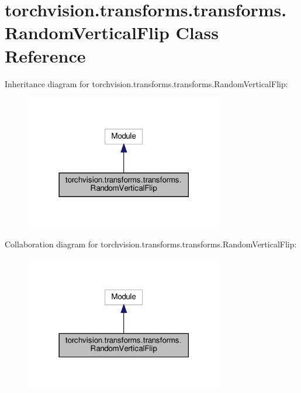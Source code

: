 \hypertarget{classtorchvision_1_1transforms_1_1transforms_1_1RandomVerticalFlip}{}\section{torchvision.\+transforms.\+transforms.\+Random\+Vertical\+Flip Class Reference}
\label{classtorchvision_1_1transforms_1_1transforms_1_1RandomVerticalFlip}


Inheritance diagram for torchvision.\+transforms.\+transforms.\+Random\+Vertical\+Flip\+:
\nopagebreak
\begin{figure}[H]
\begin{center}
\leavevmode
\includegraphics[width=246pt]{classtorchvision_1_1transforms_1_1transforms_1_1RandomVerticalFlip__inherit__graph}
\end{center}
\end{figure}


Collaboration diagram for torchvision.\+transforms.\+transforms.\+Random\+Vertical\+Flip\+:
\nopagebreak
\begin{figure}[H]
\begin{center}
\leavevmode
\includegraphics[width=246pt]{classtorchvision_1_1transforms_1_1transforms_1_1RandomVerticalFlip__coll__graph}
\end{center}
\end{figure}
